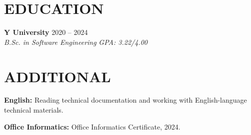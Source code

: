 \documentclass[10pt,a4paper]{article}
\newcommand{\cvjob}[4]{
    \textbf{#1} \hfill #2\\
    \textit{#3} \hfill \textit{#4}
}
\begin{document}
\section{EDUCATION}

\cvjob
{Y University}
{2020 -- 2024}
{B.Sc. in Software Engineering}
{GPA: 3.22/4.00}


\section{ADDITIONAL}

\textbf{English:}
Reading technical documentation and working with English-language
technical materials.

\textbf{Office Informatics:}
Office Informatics Certificate, 2024.
\end{document}
